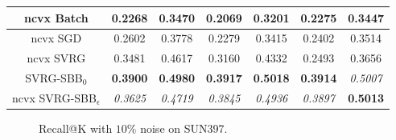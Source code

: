 \documentclass[letterpaper]{article} %
\begin{document}
{\begin{table}[tbh]
{\begin{tabular}{c||cc||cc||cc}
				ncvx Batch    & 0.2268  & 0.3470  & 0.2069  & 0.3201 & 0.2275  & 0.3447  \\ \hline
				ncvx SGD      & 0.2602  & 0.3778  & 0.2279  & 0.3415 & 0.2402  & 0.3514  \\ \hline
				ncvx SVRG     & 0.3481  & 0.4617  & 0.3160  & 0.4332 & 0.2493  & 0.3656  \\ \hline
				SVRG-SBB$_0$             &\textbf{0.3900}    & \textbf{0.4980}  & \textbf{0.3917}  & \textbf{0.5018} & \textbf{0.3914}  & \textit{0.5007}  \\ \hline
				ncvx SVRG-SBB$_\epsilon$ & \textit{0.3625}  & \textit{0.4719}  & \textit{0.3845}  & \textit{0.4936} & \textit{0.3897}  & \textbf{0.5013} \\
				\hline\hline
			\end{tabular}
		}
		\label{tabl:3}
	\end{table}
}

\begin{figure}[thb!]
	\centering
	\caption{Recall@K with $10\%$ noise on SUN397.}
	\label{fig:sun} %
\end{figure}
\end{document}

